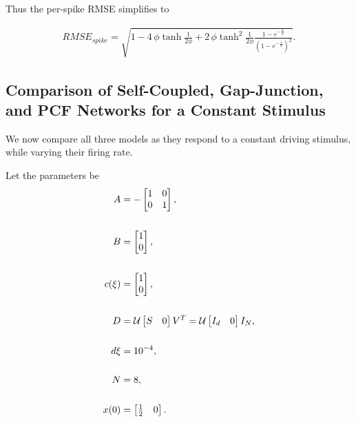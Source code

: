 Thus the per-spike RMSE simplifies to 

\begin{align}
\label{eq:analysis:comparison_sc_vs_pcf_vs_gj:per_spike_rmse_pcf_gj}
RMSE_{spike} = 
	\sqrt{
		1
		-
		4 \, \phi  \tanh
{
	\frac{1}{2\phi}
}
		 + 
	 	2 \, \phi
	 	\tanh^2{
	\frac{1}{2\phi}
}
		\frac
		{
			1 - e^{-\frac{2}{\phi}}
		}
		{
			\left(1 - e^{-\frac{1}{\phi}}\right)^2
		}
	}.
\end{align}


\subsection{Comparison of Self-Coupled, Gap-Junction, and PCF Networks for a Constant Stimulus}

We now compare all three models as they respond to a constant driving stimulus, while varying their firing rate. 

Let the parameters be 
\begin{align*}
A &= -
\begin{bmatrix}  
1 & 0 \\
0 & 1
\end{bmatrix},
\\
\\
B &=
\begin{bmatrix}  
	1
	\\
	0 
\end{bmatrix}, 
\\ 
\\
c(\xi) &=  
\begin{bmatrix}  
1  \\
0 \end{bmatrix},
\\
\\
D
&=
\mathcal{U} 
\begin{bmatrix}
S & 0
\end{bmatrix}
V^T
=
\mathcal{U} 
\begin{bmatrix}
I_d & 0
\end{bmatrix}
I_N \notag,
\\
\\
d\xi &= 10^{-4}, \notag \\
\notag \\
N &= 8,\notag \\
\notag \\
x(0) &= \begin{bmatrix} \frac{1}{2} & 0 \end{bmatrix}.
\end{align*}



